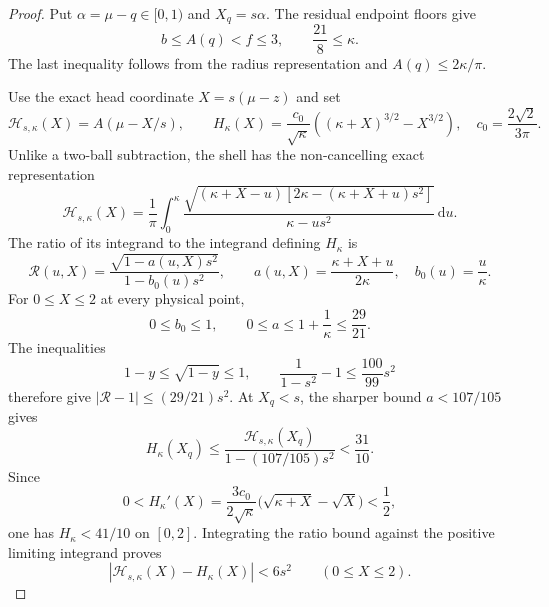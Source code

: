 \documentclass[11pt]{article}
\theoremstyle{remark}
\newcommand{\dd}{\,\mathrm d}
\begin{document}
\begin{proof}
Put $\alpha=\mu-q\in[0,1)$ and $X_q=s\alpha$.  The residual endpoint
floors give
\begin{equation}
 b\leq A(q)<f\leq3,
 \qquad \frac{21}{8}\leq\kappa.
 \label{eq:round-five-endpoint-box}
\end{equation}
The last inequality follows from the radius representation and
$A(q)\leq2\kappa/\pi$.

Use the exact head coordinate $X=s(\mu-z)$ and set
\[
 \mathcal H_{s,\kappa}(X)=A(\mu-X/s),\qquad
 H_\kappa(X)=\frac{c_0}{\sqrt\kappa}
 \left((\kappa+X)^{3/2}-X^{3/2}\right),
 \quad c_0=\frac{2\sqrt2}{3\pi}.
\]
Unlike a two-ball subtraction, the shell has the non-cancelling exact
representation
\begin{equation}
 \mathcal H_{s,\kappa}(X)=\frac1\pi\int_0^\kappa
 \frac{\sqrt{(\kappa+X-u)
 [2\kappa-(\kappa+X+u)s^2]}}
 {\kappa-us^2}\dd u.
 \label{eq:round-five-shell-integral}
\end{equation}
The ratio of its integrand to the integrand defining $H_\kappa$ is
\[
 \mathcal R(u,X)=
 \frac{\sqrt{1-a(u,X)s^2}}{1-b_0(u)s^2},\qquad
 a(u,X)=\frac{\kappa+X+u}{2\kappa},\quad
 b_0(u)=\frac u\kappa.
\]
For $0\leq X\leq2$ at every physical point,
\[
 0\leq b_0\leq1,\qquad0\leq a\leq1+\frac1\kappa\leq\frac{29}{21}.
\]
The inequalities
\[
 1-y\leq\sqrt{1-y}\leq1,\qquad
 \frac1{1-s^2}-1\leq\frac{100}{99}s^2
\]
therefore give $|\mathcal R-1|\leq(29/21)s^2$.  At $X_q<s$, the sharper
bound $a<107/105$ gives
\[
 H_\kappa(X_q)
 \leq\frac{\mathcal H_{s,\kappa}(X_q)}
 {1-(107/105)s^2}<\frac{31}{10}.
\]
Since
\[
 0<H_\kappa'(X)=\frac{3c_0}{2\sqrt\kappa}
 \bigl(\sqrt{\kappa+X}-\sqrt X\bigr)<\frac12,
\]
one has $H_\kappa<41/10$ on $[0,2]$.  Integrating the ratio bound against
the positive limiting integrand proves
\begin{equation}
 \left|\mathcal H_{s,\kappa}(X)-H_\kappa(X)\right|<6s^2
 \qquad(0\leq X\leq2).
 \label{eq:quantitative-turning-error}
\end{equation}


\end{proof}
\end{document}
